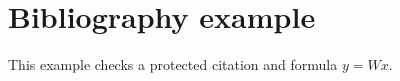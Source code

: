 \documentclass{article}
\begin{document}
\section{Bibliography example}
This example checks a protected citation \parencite{sample} and formula $y=Wx$.
\printbibliography
\end{document}
